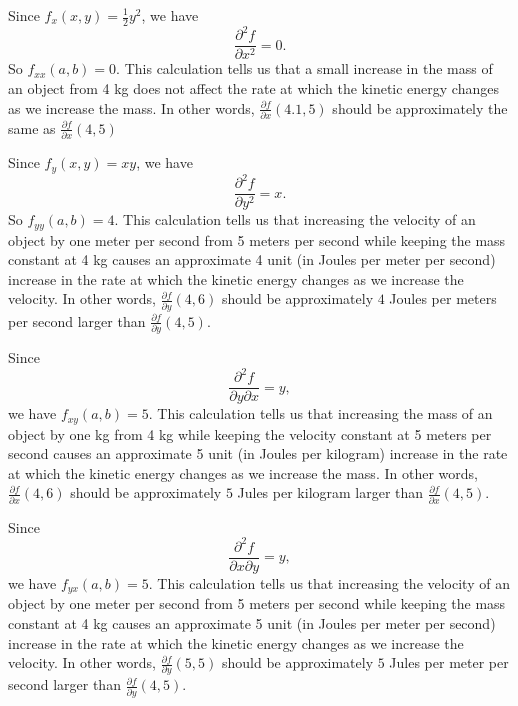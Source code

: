 \begin{activitySolution}
\ba
\item Since $f_x(x,y) = \frac{1}{2}y^2$, we have 
\[\frac{ \partial^2 f}{\partial x^2}  = 0.\]
So $f_{xx}(a,b) = 0$.  This calculation tells us that a small increase in the mass of an object from 4 kg does not affect the rate at which the kinetic energy changes as we increase the mass. In other words, $\frac{\partial f}{\partial x}(4.1,5)$ should be approximately the same as $\frac{\partial f}{\partial x}(4,5)$ 

\item Since $f_y(x,y) = xy$, we have 
\[\frac{ \partial^2 f}{\partial y^2}  = x.\]
So $f_{yy}(a,b) = 4$.  This calculation tells us that increasing the velocity of an object by one meter per second from 5 meters per second while keeping the mass constant at 4 kg causes an approximate 4 unit (in Joules per meter per second) increase in the rate at which the kinetic energy changes as we increase the velocity. In other words, $\frac{\partial f}{\partial y}(4,6)$ should be approximately $4$ Joules per meters per second larger than $\frac{\partial f}{\partial y}(4,5)$.  

\item Since  
\[\frac{ \partial^2 f}{\partial y \partial x}  = y,\]
we have $f_{xy}(a,b) = 5$.  This calculation tells us that increasing the mass of an object by one kg from 4 kg while keeping the velocity constant at 5 meters per second causes an approximate 5 unit (in Joules per kilogram) increase in the rate at which the kinetic energy changes as we increase the mass. In other words, $\frac{\partial f}{\partial x}(4,6)$ should be approximately $5$ Jules per kilogram larger than $\frac{\partial f}{\partial x}(4,5)$.  

\item Since  
\[\frac{ \partial^2 f}{\partial x \partial y}  = y,\]
we have $f_{yx}(a,b) = 5$.  This calculation tells us that increasing the velocity of an object by one meter per second from 5 meters per second while keeping the mass constant at 4 kg causes an approximate 5 unit (in Joules per meter per second) increase in the rate at which the kinetic energy changes as we increase the velocity. In other words, $\frac{\partial f}{\partial y}(5,5)$ should be approximately $5$ Jules per meter per second larger than $\frac{\partial f}{\partial y}(4,5)$.  

\ea

\end{activitySolution}
\aftera
